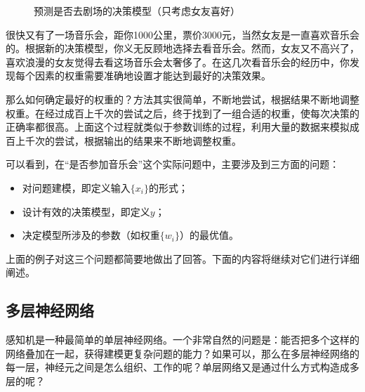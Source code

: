 \begin{figure}[htp]
\centering

\caption{预测是否去剧场的决策模型（只考虑女友喜好）}
\label{fig:5-9}
\end{figure}

\parinterval 很快又有了一场音乐会，距你1000公里，票价3000元，当然女友是一直喜欢音乐会的。根据新的决策模型，你义无反顾地选择去看音乐会。然而，女友又不高兴了，喜欢浪漫的女友觉得去看这场音乐会太奢侈了。在这几次看音乐会的经历中，你发现每个因素的权重需要准确地设置才能达到最好的决策效果。

\parinterval 那么如何确定最好的权重的？方法其实很简单，不断地尝试，根据结果不断地调整权重。在经过成百上千次的尝试之后，终于找到了一组合适的权重，使每次决策的正确率都很高。上面这个过程就类似于参数训练的过程，利用大量的数据来模拟成百上千次的尝试，根据输出的结果来不断地调整权重。

\parinterval 可以看到，在``是否参加音乐会''这个实际问题中，主要涉及到三方面的问题：

\begin{itemize}
\vspace{0.5em}
\item 对问题建模，即定义输入$ \{x_i\} $的形式；
\vspace{0.5em}
\item 设计有效的决策模型，即定义$ y $；
\vspace{0.5em}
\item 决定模型所涉及的参数（如权重$ \{w_i\} $）的最优值。
\vspace{0.5em}
\end{itemize}

\parinterval 上面的例子对这三个问题都简要地做出了回答。下面的内容将继续对它们进行详细阐述。


\subsection{多层神经网络}

\parinterval 感知机是一种最简单的单层神经网络。一个非常自然的问题是：能否把多个这样的网络叠加在一起，获得建模更复杂问题的能力？如果可以，那么在多层神经网络的每一层，神经元之间是怎么组织、工作的呢？单层网络又是通过什么方式构造成多层的呢？

